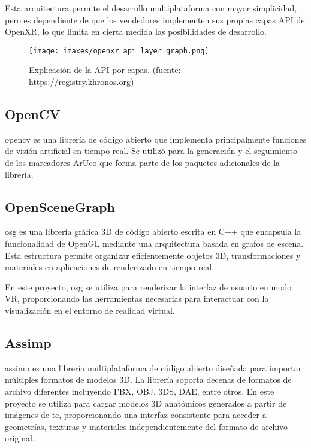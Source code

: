Esta arquitectura permite el desarrollo multiplataforma con mayor simplicidad, pero es dependiente de que los vendedores implementen sus propias capas API de OpenXR, lo que limita en cierta medida las posibilidades de desarrollo. 

\begin{figure}
  \centering
  \texttt{[image: imaxes/openxr\_api\_layer\_graph.png]}
  \caption{Explicación de la API por capas. (fuente: \href{https://registry.khronos.org/OpenXR/specs/1.0/loader.html}{https://registry.khronos.org})}
  \label{fig:openxrapilayer}
\end{figure}

\subsection{OpenCV}
\acrfull{opencv} es una librería de código abierto que implementa principalmente funciones de visión artificial en tiempo real. Se utilizó para la generación y el seguimiento de los marcadores ArUco que forma parte de los paquetes adicionales de la librería.

\subsection{OpenSceneGraph}
\acrfull{osg} es una librería gráfica 3D de código abierto escrita en C++ que encapsula la funcionalidad de OpenGL mediante una arquitectura basada en grafos de escena. Esta estructura permite organizar eficientemente objetos 3D, transformaciones y materiales en aplicaciones de renderizado en tiempo real.

En este proyecto, \acrshort{osg} se utiliza para renderizar la interfaz de usuario en modo VR, proporcionando las herramientas necesarias para interactuar con la visualización en el entorno de realidad virtual.

\subsection{Assimp}
\acrfull{assimp} es una librería multiplataforma de código abierto diseñada para importar múltiples formatos de modelos 3D. La librería soporta decenas de formatos de archivo diferentes incluyendo FBX, OBJ, 3DS, DAE, entre otros. En este proyecto se utiliza para cargar modelos 3D anatómicos generados a partir de imágenes de \acrshort{tc}, proporcionando una interfaz consistente para acceder a geometrías, texturas y materiales independientemente del formato de archivo original.

